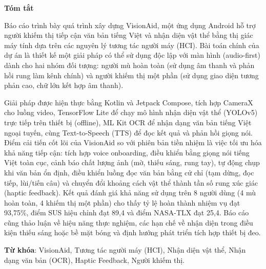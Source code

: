 \documentclass[a4paper,13pt]{report}
\begin{document}
\newpage\cleardoublepage

\begin{center}
\textbf{\large{Tóm tắt}}
\end{center}

Báo cáo trình bày quá trình xây dựng VisionAid, một ứng dụng Android hỗ trợ người khiếm thị tiếp cận văn bản tiếng Việt và nhận diện vật thể bằng thị giác máy tính dựa trên các nguyên lý tương tác người máy (HCI). Bài toán chính của dự án là thiết kế một giải pháp có thể sử dụng độc lập với màn hình (audio-first) dành cho hai nhóm đối tượng: người mù hoàn toàn (sử dụng âm thanh và phản hồi rung làm kênh chính) và người khiếm thị một phần (sử dụng giao diện tương phản cao, chữ lớn kết hợp âm thanh).

Giải pháp được hiện thực bằng Kotlin và Jetpack Compose, tích hợp CameraX cho luồng video, TensorFlow Lite để chạy mô hình nhận diện vật thể (YOLOv5) trực tiếp trên thiết bị (offline), ML Kit OCR để nhận dạng văn bản tiếng Việt ngoại tuyến, cùng Text-to-Speech (TTS) để đọc kết quả và phản hồi giọng nói. Điểm cải tiến cốt lõi của VisionAid so với phiên bản tiền nhiệm là việc tối ưu hóa khả năng tiếp cận: tích hợp voice onboarding, điều khiển bằng giọng nói tiếng Việt toàn cục, cảnh báo chất lượng ảnh (mờ, thiếu sáng, rung tay), tự động chụp khi văn bản ổn định, điều khiển luồng đọc văn bản bằng cử chỉ (tạm dừng, đọc tiếp, lùi/tiến câu) và chuyển đổi khoảng cách vật thể thành tần số rung xúc giác (haptic feedback). Kết quả đánh giá khả năng sử dụng trên 8 người dùng (4 mù hoàn toàn, 4 khiếm thị một phần) cho thấy tỷ lệ hoàn thành nhiệm vụ đạt 93,75\%, điểm SUS hiệu chỉnh đạt 89,4 và điểm NASA-TLX đạt 25,4. Báo cáo cũng thảo luận về hiệu năng thực nghiệm, các hạn chế về nhận diện trong điều kiện thiếu sáng hoặc bề mặt bóng và định hướng phát triển tích hợp thiết bị đeo.

\vspace*{1cm}
\textbf{Từ khóa}: VisionAid, Tương tác người máy (HCI), Nhận diện vật thể, Nhận dạng văn bản (OCR), Haptic Feedback, Người khiếm thị.

\newpage\cleardoublepage

\newpage
{}
{
\small
\setlength{\cftbeforetoctitleskip}{-1em}
\setlength{\cftaftertoctitleskip}{0.5em}
\setlength{\cftbeforechapskip}{0.2em}
\setlength{\cftbeforesecskip}{0em}
\tableofcontents
}
\newpage\cleardoublepage

\newpage
{}
{
\setlength{\cftbeforetoctitleskip}{-1em}
\setlength{\cftaftertoctitleskip}{0.5em}
\setlength{\cftbeforechapskip}{0.2em}
\setlength{\cftbeforesecskip}{0em}
\listoffigures
}
\cleardoublepage
\end{document}
